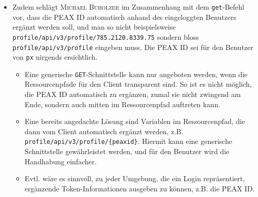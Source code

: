 \begin{itemize}
\begin{itemize}
        \item \textsc{Go} bietet jedoch mit \texttt{json.Indent} eine sehr komfortable Funktion, womit ein beliebiger JSON-Payload\footnote{D.h. nicht nur ein JSON-Payload, dessen Struktur mittels einer \texttt{struct} und den entsprechenden Annotations beschrieben ist, was zu einem unverhältnismässigen Mehraufwand führen würde, zumal dann jeder mögliche Payload statisch beschrieben sein müsste.} einfach formatiert werden kann.
        \item Der Vorschlag soll umgesetzt werden. Weitere Features im Zusammenhang mit generischer JSON-Verarbeitung sollen jedoch der UNIX-Philosophie entsprechend an \texttt{jq} oder ähnliche Programme mittels Pipe delegiert werden.
    \end{itemize}
\item Zudem schlägt \textsc{Michael Buholzer} im Zusammenhang mit dem \texttt{get}-Befehl vor, dass die PEAX ID automatisch anhand des eingeloggten Benutzers ergänzt werden soll, und man so nicht beispielsweise \texttt{profile/api/v3/profile/785.2120.8339.75} sondern bloss \texttt{profile/api/v3/profile} eingeben muss. Die PEAX ID sei für den Benutzer von \texttt{px} nirgends ersichtlich.
    \begin{itemize}
        \item Eine generische \texttt{GET}-Schnittstelle kann nur angeboten werden, wenn die Ressourcenpfade für den Client transparent sind. So ist es nicht möglich, die PEAX ID automatisch zu ergänzen, zumal sie nicht zwingend am Ende, sondern auch mitten im Ressourcenpfad auftreten kann.
        \item Eine bereits angedachte Lösung sind Variablen im Ressourcenpfad, die dann vom Client automatisch ergänzt werden, z.B. \texttt{profile/api/v3/profile/\{peaxid\}}. Hiermit kann eine generische Schnittstelle gewährleistet werden, und für den Benutzer wird die Handhabung einfacher.
        \item Evtl. wäre es sinnvoll, zu jeder Umgebung, die ein Login repräsentiert, ergänzende Token-Informationen ausgeben zu können, z.B. die PEAX ID.
    \end{itemize}
\end{itemize}
